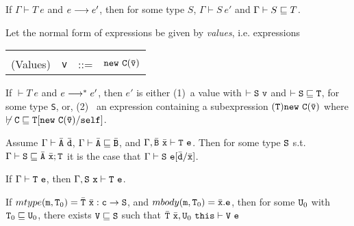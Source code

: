 \begin{theorem} 

If $\Gamma \vdash T\ e$ and $e \derives e'$, then for some type $S$,
$\Gamma \vdash S\ e'$ and $\Gamma \vdash S \subtype T$.

\end{theorem}


Let the normal form of expressions be given by {\em values},
i.e. expressions 

\begin{tabular}{rrcl}
&&&\\
(Values) & {\tt v} &{::=}& $\new\ {\tt C(\bar{\tt v})}$
\end{tabular}


\begin{theorem} 

If $\vdash T\ e$ and $e \starderives e'$, then $e'$ is
either (1)~a value {\tt } with $\vdash {\tt S\ v}$ and $\vdash {\tt S
\subtype T}$, for some type {\tt S}, or, (2)~ an expression containing
a subexpression ${\tt (T)\new\ C(\bar{\tt v})}$ where 
$\not\vdash \tt C\subtype T[\new\ C(\bar{\tt v})/\self]$.

\end{theorem}

\begin{lemma}
Assume $\Gamma \vdash \bar{\tt A}\ \bar{\tt d}$, $\Gamma \vdash \bar{\tt A}\subtype \bar{\tt B}$, and $\Gamma, \bar{\tt B}\ \bar{\tt x} \vdash {\tt T}\ {\tt e}$. Then for some type ${\tt S}$ s.t. $\Gamma \vdash {\tt S} \subtype \bar{\tt A}\ \bar{\tt x};{\tt T}$ it is the case that $\Gamma \vdash {\tt S}\ {\tt e}[\bar{\tt d}/\bar{\tt x}]$.
\end{lemma}

\begin{lemma}[Weakening]
If $\Gamma \vdash {\tt T}\ {\tt e}$, then $\Gamma, {\tt S}\ {\tt x}\vdash {\tt T}\ {\tt e}$.
\end{lemma}

\begin{lemma}
If $mtype({\tt m}, {\tt T}_0)=\bar{\tt T}\ \bar{\tt x} : {\tt c}
\rightarrow {\tt S}$, and $mbody({\tt m}, {\tt T}_0)=\bar{\tt x}.{\tt
e}$, then for some ${\tt U}_0$ with ${\tt T}_0 \subtype {\tt U}_0$,
there exists ${\tt V}\subtype {\tt S}$ such that
$\bar{\tt T}\ \bar{\tt x},{\tt U}_0\ \this \vdash {\tt V}\ {\tt e}$
\end{lemma}